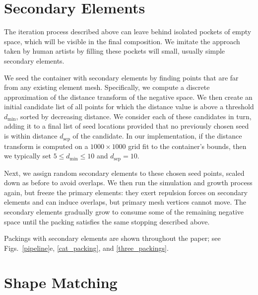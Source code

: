 \section{Secondary Elements}
\label{repulsionpak_secondary_elements}

The iteration process described above can leave behind isolated pockets of 
empty space, which will be visible in the final composition.  We imitate the
approach taken by human artists by filling these pockets will small, usually
simple secondary elements.  

We seed the container with secondary elements by finding points
that are far from any existing element mesh.  Specifically, we
compute a discrete approximation of the distance transform of the
negative space. We then create an initial candidate list of all
points for which the distance value is above a threshold $d_\mathrm{min}$, sorted
by decreasing distance.  We consider each of these candidates in turn,
adding it to a final list of seed locations provided that no previously
chosen seed is within distance $d_\mathrm{sep}$ of the candidate.
In our implementation, if the distance transform is computed on a 
$1000\times 1000$ grid fit to the container's bounds, then we typically 
set $5 \leq d_\mathrm{min} \leq 10$ and $d_\mathrm{sep}=10$. 

Next, we assign random secondary elements to these chosen seed
points, scaled down as before to avoid overlaps.  We then run the
simulation and growth process again, but freeze the primary elements:
they exert repulsion forces on secondary elements and can induce
overlaps, but primary mesh vertices cannot move.  The secondary
elements gradually grow to consume some of the remaining negative
space until the packing satisfies the same stopping 
described above.

Packings with secondary elements are shown throughout the paper; 
see Figs.~\ref{pipeline}e, \ref{cat_packing}, and \ref{three_packings}.


\section{Shape Matching}
\label{repulsionpak_shape_matching}



